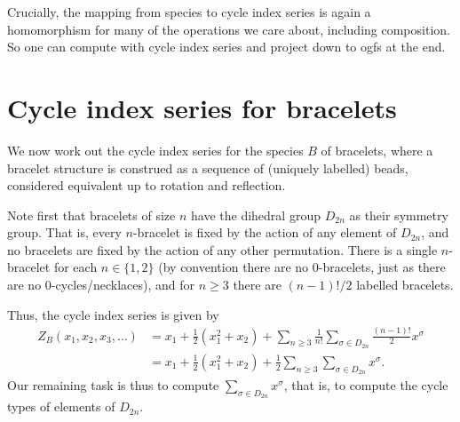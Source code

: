 \documentclass{article}
\begin{document}
Crucially, the mapping from species to cycle index series is again a
homomorphism for many of the operations we care about, including
composition.  So one can compute with cycle index series and project
down to ogfs at the end.

\section{Cycle index series for bracelets}
\label{sec:bracelet-cycle-index}

We now work out the cycle index series for the species $B$ of
bracelets, where a bracelet structure is construed as a sequence of
(uniquely labelled) beads, considered equivalent up to rotation and
reflection.

Note first that bracelets of size $n$ have the dihedral group $D_{2n}$
as their symmetry group.  That is, every $n$-bracelet is fixed by the
action of any element of $D_{2n}$, and no bracelets are fixed by the
action of any other permutation.  There is a single $n$-bracelet for
each $n \in \{1,2\}$ (by convention there are no $0$-bracelets, just
as there are no $0$-cycles/necklaces), and for $n \geq 3$ there are
$(n-1)!/2$ labelled bracelets.

Thus, the cycle index series is given by
\begin{align*}
Z_B(x_1, x_2, x_3, \dots)
&= x_1 + \frac{1}{2}(x_1^2 + x_2) + \sum_{n \geq 3} \frac{1}{n!}
\sum_{\sigma \in D_{2n}} \frac{(n-1)!}{2} x^\sigma \\
&= x_1 + \frac{1}{2}(x_1^2 + x_2) + \frac{1}{2} \sum_{n \geq 3}
\sum_{\sigma \in D_{2n}} x^\sigma.
\end{align*}
Our remaining task is thus to compute $\sum_{\sigma \in D_{2n}}
x^\sigma$, that is, to compute the cycle types of elements of
$D_{2n}$.
\end{document}
